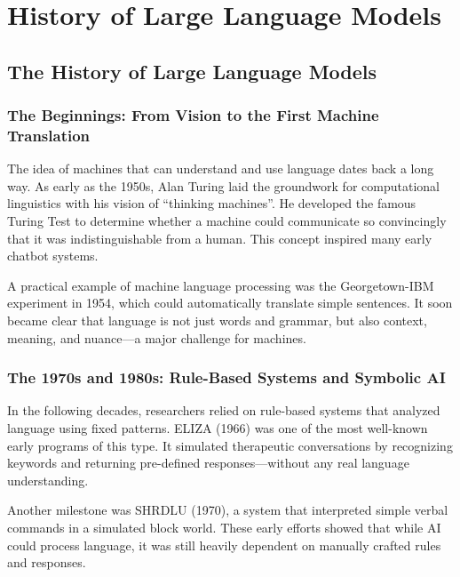 \chapter{History of Large Language Models}

%

\section{The History of Large Language Models}

\subsection{The Beginnings: From Vision to the First Machine Translation}

The idea of machines that can understand and use language dates back a long way.
As early as the 1950s, Alan Turing laid the groundwork for computational linguistics
with his vision of “thinking machines”. He developed the famous Turing Test to
determine whether a machine could communicate so convincingly that it was
indistinguishable from a human. This concept inspired many early chatbot systems.

A practical example of machine language processing was the Georgetown-IBM
experiment in 1954, which could automatically translate simple sentences.
It soon became clear that language is not just words and grammar, but also context,
meaning, and nuance—a major challenge for machines.

\subsection{The 1970s and 1980s: Rule-Based Systems and Symbolic AI}

In the following decades, researchers relied on rule-based systems that analyzed
language using fixed patterns. ELIZA (1966) was one of the most well-known early
programs of this type. It simulated therapeutic conversations by recognizing keywords
and returning pre-defined responses—without any real language understanding.

Another milestone was SHRDLU (1970), a system that interpreted simple verbal commands
in a simulated block world. These early efforts showed that while AI could process
language, it was still heavily dependent on manually crafted rules and responses.


